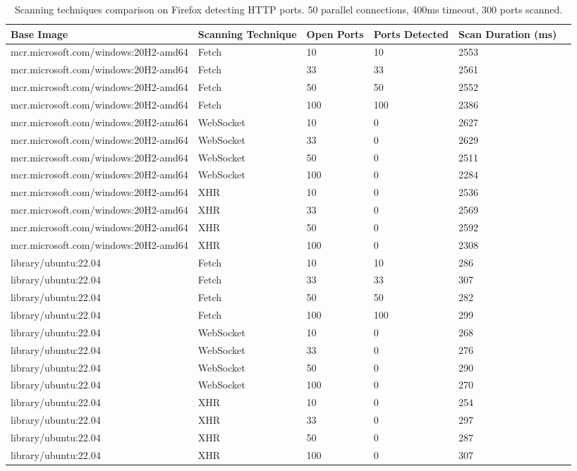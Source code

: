 \clearpage

\begin{table}[htbp]
    \footnotesize
    \centering
    \begin{tabular}{p{6.3cm}p{1.5cm}p{1.7cm}p{1.7cm}p{2.2cm}p{3cm}}
        \toprule
        Base Image & Scanning Technique & Open Ports & Ports Detected & Scan Duration (ms) \\
        \midrule
        mcr.microsoft.com/windows:20H2-amd64 & Fetch & 10 & 10 & 2553 \\
        mcr.microsoft.com/windows:20H2-amd64 & Fetch & 33 & 33 & 2561 \\
        mcr.microsoft.com/windows:20H2-amd64 & Fetch & 50 & 50 & 2552 \\
        mcr.microsoft.com/windows:20H2-amd64 & Fetch & 100 & 100 & 2386 \\
        \midrule
        mcr.microsoft.com/windows:20H2-amd64 & WebSocket & 10 & 0 & 2627 \\
        mcr.microsoft.com/windows:20H2-amd64 & WebSocket & 33 & 0 & 2629 \\
        mcr.microsoft.com/windows:20H2-amd64 & WebSocket & 50 & 0 & 2511 \\
        mcr.microsoft.com/windows:20H2-amd64 & WebSocket & 100 & 0 & 2284 \\
        \midrule
        mcr.microsoft.com/windows:20H2-amd64 & XHR & 10 & 0 & 2536 \\
        mcr.microsoft.com/windows:20H2-amd64 & XHR & 33 & 0 & 2569 \\
        mcr.microsoft.com/windows:20H2-amd64 & XHR & 50 & 0 & 2592 \\
        mcr.microsoft.com/windows:20H2-amd64 & XHR & 100 & 0 & 2308 \\
        \midrule
        library/ubuntu:22.04 & Fetch & 10 & 10 & 286 \\
        library/ubuntu:22.04 & Fetch & 33 & 33 & 307 \\
        library/ubuntu:22.04 & Fetch & 50 & 50 & 282 \\
        library/ubuntu:22.04 & Fetch & 100 & 100 & 299 \\
        \midrule
        library/ubuntu:22.04 & WebSocket & 10 & 0 & 268 \\
        library/ubuntu:22.04 & WebSocket & 33 & 0 & 276 \\
        library/ubuntu:22.04 & WebSocket & 50 & 0 & 290 \\
        library/ubuntu:22.04 & WebSocket & 100 & 0 & 270 \\
        \midrule
        library/ubuntu:22.04 & XHR & 10 & 0 & 254 \\
        library/ubuntu:22.04 & XHR & 33 & 0 & 297 \\
        library/ubuntu:22.04 & XHR & 50 & 0 & 287 \\
        library/ubuntu:22.04 & XHR & 100 & 0 & 307 \\
        \bottomrule
    \end{tabular}
    \caption{Scanning techniques comparison on Firefox detecting HTTP ports. 50 parallel connections, 400ms timeout, 300 ports scanned.}
    \label{tab:scan-technique-comparison-firefox}
\end{table}

